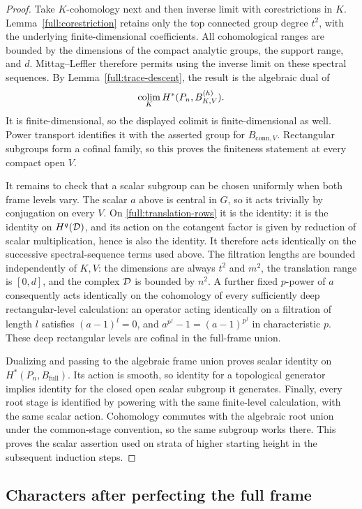 \begin{proof}
Take $K$-cohomology next and then inverse limit with corestrictions in
$K$.  Lemma~\ref{full:corestriction} retains only the top connected
group degree $t^2$, with the underlying finite-dimensional
coefficients.  All cohomological ranges are bounded by the dimensions
of the compact analytic groups, the support range, and $d$.
Mittag--Leffler therefore permits using the inverse limit on these
spectral sequences.  By Lemma~\ref{full:trace-descent}, the result is
the algebraic dual of
\[
 \operatorname*{colim}_K H^*(P_n,B_{K,V}^{(h)}).
\]
It is finite-dimensional, so the displayed colimit is
finite-dimensional as well.  Power transport identifies it with the
asserted group for $B_{\mathrm{conn},V}$.  Rectangular subgroups form a
cofinal family, so this proves the finiteness statement at every
compact open $V$.

It remains to check that a scalar subgroup can be chosen uniformly
when both frame levels vary.  The scalar $a$ above is central in $G$,
so it acts trivially by conjugation on every $V$.  On
\eqref{full:translation-rows} it is the identity: it is the identity
on $H^q(\mathcal D)$, and its action on the cotangent factor is given by
reduction of scalar multiplication, hence is also the identity.
It therefore acts identically on the successive spectral-sequence
terms used above.  The filtration lengths are bounded independently
of $K,V$: the dimensions are always $t^2$ and $m^2$, the translation
range is $[0,d]$, and the complex $\mathcal D$ is bounded by $n^2$.
A further fixed $p$-power of $a$ consequently acts identically on the
cohomology of every sufficiently deep rectangular-level calculation:
an operator acting identically on a filtration of length $l$ satisfies
$(a-1)^l=0$, and $a^{p^j}-1=(a-1)^{p^j}$ in characteristic $p$.
These deep rectangular levels are cofinal in the full-frame union.

Dualizing and passing to the algebraic frame union proves scalar
identity on $H^*(P_n,B_{\mathrm{full}})$.  Its action is smooth, so
identity for a topological generator implies identity for the closed
open scalar subgroup it generates.  Finally, every root stage is
identified by powering with the same finite-level calculation, with
the same scalar action.  Cohomology commutes with the algebraic root
union under the common-stage convention, so the same subgroup works
there.  This proves the scalar assertion used on strata of higher
starting height in the subsequent induction steps.
\end{proof}

\subsection{Characters after perfecting the full frame}

